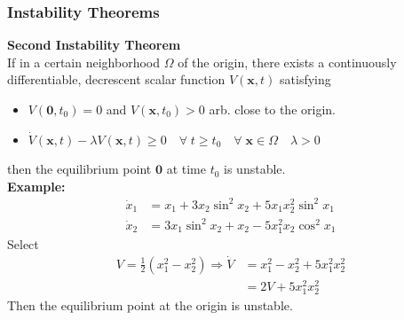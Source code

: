 \documentclass[11pt,handout]{beamer}   %
\begin{document}
\begin{frame}
\frametitle{Instability Theorems}
\small
\textbf{Second Instability Theorem}\\
If in a certain neighborhood $\Omega$ of the origin, there exists a continuously differentiable, decrescent scalar function $V(\mathbf{x},t)$ satisfying
\begin{itemize}
\item $V(\mathbf{0},t_0) = 0$ and $V(\mathbf{x},t_0) > 0$ arb. close to the origin.  
\item $\dot{V}(\mathbf{x},t) - \lambda V(\mathbf{x},t) \geq 0 \quad \forall \; t \geq t_0 \quad \forall \; \mathbf{x} \in \Omega \quad \lambda > 0$
\end{itemize}
then the equilibrium point $\mathbf{0}$ at time $t_0$ is unstable.\\
\vspace{6pt}
\textbf{Example:}
\begin{equation*}
\begin{aligned}
\dot{x}_1 &= x_1 + 3 x_2 \sin ^2 x_2 + 5 x_1 x_2 ^2 \sin ^2 x_1\\ 
\dot{x}_2 &= 3 x_1 \sin ^2 x_2 + x_2 - 5x_1^2 x_2 \cos^2 x_1
\end{aligned}
\end{equation*}
Select
\begin{equation*}
\begin{aligned}
V = \frac{1}{2}(x_1^2 - x_2^2) \Rightarrow \dot{V} &= x_1^2 - x_2^2 + 5x_1^2 x_2^2 \\
&= 2V + 5x_1^2 x_2^2
\end{aligned}
\end{equation*}
Then the equilibrium point at the origin is unstable.
\end{frame}


\end{document}
